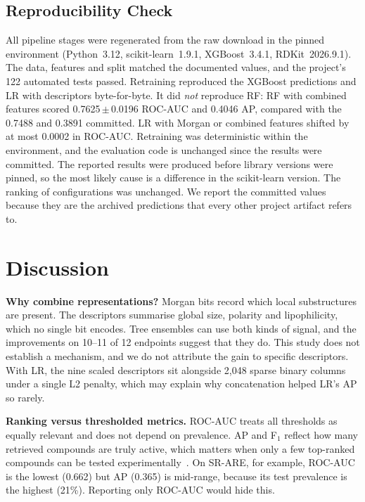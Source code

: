 \documentclass[conference]{IEEEtran}
\newcommand{\pmsem}[2]{#1\,$\pm$\,#2}
\begin{document}
\subsection{Reproducibility Check}\label{sec:repro}
All pipeline stages were regenerated from the raw download in the pinned environment (Python~3.12, scikit-learn~1.9.1, XGBoost~3.4.1, RDKit~2026.9.1). The data, features and split matched the documented values, and the project's 122 automated tests passed. Retraining reproduced the XGBoost predictions and LR with descriptors byte-for-byte. It did \emph{not} reproduce RF: RF with combined features scored \pmsem{0.7625}{0.0196} ROC-AUC and 0.4046 AP, compared with the 0.7488 and 0.3891 committed. LR with Morgan or combined features shifted by at most 0.0002 in ROC-AUC. Retraining was deterministic within the environment, and the evaluation code is unchanged since the results were committed. The reported results were produced before library versions were pinned, so the most likely cause is a difference in the scikit-learn version. The ranking of configurations was unchanged. We report the committed values because they are the archived predictions that every other project artifact refers to.

\section{Discussion}
\textbf{Why combine representations?} Morgan bits record which local substructures are present. The descriptors summarise global size, polarity and lipophilicity, which no single bit encodes. Tree ensembles can use both kinds of signal, and the improvements on 10--11 of 12 endpoints suggest that they do. This study does not establish a mechanism, and we do not attribute the gain to specific descriptors. With LR, the nine scaled descriptors sit alongside 2,048 sparse binary columns under a single L2 penalty, which may explain why concatenation helped LR's AP so rarely.

\textbf{Ranking versus thresholded metrics.} ROC-AUC treats all thresholds as equally relevant and does not depend on prevalence. AP and F$_1$ reflect how many retrieved compounds are truly active, which matters when only a few top-ranked compounds can be tested experimentally~\cite{saito2015precision}. On SR-ARE, for example, ROC-AUC is the lowest (0.662) but AP (0.365) is mid-range, because its test prevalence is the highest (21\%). Reporting only ROC-AUC would hide this.
\end{document}

